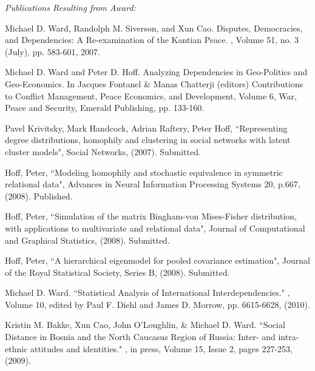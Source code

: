 \documentclass[pdftex,12pt,fullpage,oneside]{amsart}
\begin{document}
\textit{Publications Resulting from Award:}

\begin{list}{}{\leftmargin=1em} \small
\item Michael D. Ward, Randolph M. Siverson, and Xun Cao.  \newblock
  Disputes, Democracies, and Dependencies: A Re-examination of the
  Kantian Peace.  , Volume 51, no. 3 (July), pp. 583-601, 2007.

\item Michael D. Ward and Peter D. Hoff.  \newblock Analyzing
  Dependencies in Geo-Politics and Geo-Economics.  \newblock In
  Jacques Fontanel \& Manas Chatterji (editors) {\sc Contributions to
    Conflict Management, Peace Economics, and Development, Volume 6,
    War, Peace and Security}, Emerald Publishing, pp. 133-160.

\item Pavel Krivitsky, Mark Handcock, Adrian Raftery, Peter Hoff,
  ``Representing degree distributions, homophily and clustering in
  social networks with latent cluster models", {\sc Social Networks},
  (2007). Submitted.

\item  Hoff, Peter, ``Modeling homophily and stochastic equivalence in
  symmetric relational data", Advances in Neural Information
  Processing Systems 20, p.667, (2008). Published.

\item Hoff, Peter, ``Simulation of the matrix Bingham-von Mises-Fisher
  distribution, with applications to multivariate and relational
  data", {\sc Journal of Computational and Graphical Statistics},
  (2008). Submitted.

\item Hoff, Peter, ``A hierarchical eigenmodel for pooled covariance
  estimation", {\sc Journal of the Royal Statistical Society}, Series
  B, (2008). Submitted.

\item Michael D. Ward.  \newblock ``Statistical Analysis of
  International Interdependencies."  , Volume 10, edited by Paul F. Diehl and
  James D. Morrow, pp. 6615-6628, (2010).

\item Kristin M. Bakke, Xun Cao, John O'Loughlin, \& Michael D. Ward.
  \newblock ``Social Distance in Bosnia and the North Caucasus Region
  of Russia: Inter- and intra-ethnic attitudes and identities."
  , in press, Volume 15, Issue
  2, pages 227-253, (2009).


\end{list}
\end{document}
